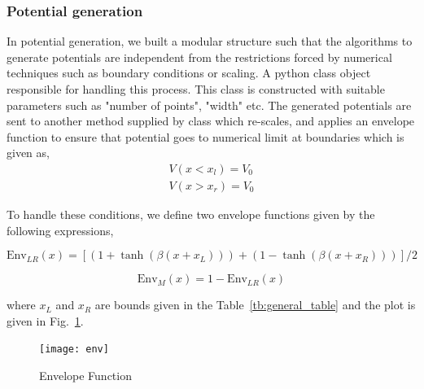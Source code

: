 \documentclass[a4paper,times,hidelinks,12pt]{article}
\begin{document}
\subsubsection{Potential generation} \label{sec:potential_generation}

In potential generation, we built a modular structure such that the algorithms to generate potentials are independent from the restrictions forced by numerical techniques such as boundary conditions or scaling. A python class object responsible for handling this process. This class is constructed with suitable parameters such as "number of points", "width" etc. The generated potentials are sent to another method supplied by class which re-scales, and applies an envelope function to ensure that potential goes to numerical limit at boundaries which is given as,
\begin{equation}
\label{eq:potential_boundary_conditions}
\begin{split}
    V(x < x_l) = V_0 \\ 
    V(x > x_r) = V_0
\end{split}
\end{equation}

To handle these conditions, we define two envelope functions given by the following expressions, 

\begin{equation}
\label{eq:envelope_potential_lr}
    \text{Env}_{LR}(x) = [(1 + \tanh{(\beta(x + x_L))}) + (1 - \tanh{(\beta(x + x_R))})]/2
\end{equation}

\begin{equation}
\label{eq:envelope_potential_m}
    \text{Env}_{M}(x) = 1 - \text{Env}_{LR}(x)
\end{equation}

\noindent where $x_L$ and $x_R$ are bounds given in the Table~\eqref{tb:general_table} and the plot is given in Fig.~\ref{fig:envelope_and_random_withot_pros}.  

\graphicspath{{"../figs/potentials/"}}
\begin{figure}[H]
\centering
\texttt{[image: env]}
\caption{Envelope Function}
\label{fig:envelope_and_random_withot_pros}
\end{figure}
\end{document}
